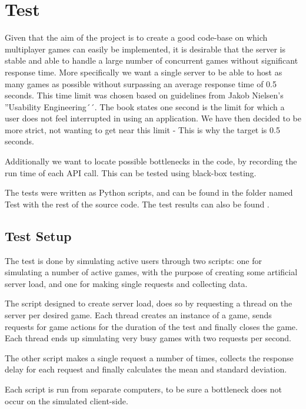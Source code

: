 \section{Test} \label{sec:test}
Given that the aim of the project is to create a good code-base on which multiplayer games can easily be implemented, it is desirable that the server is stable and able to handle a large number of concurrent games without significant response time. More specifically we want a single server to be able to host as many games as possible without surpassing an average response time of 0.5 seconds. This time limit was chosen based on guidelines from Jakob Nielsen's ''Usability Engineering´´.\cite{response-time} The book states one second is the limit for which a user does not feel interrupted in using an application. We have then decided to be more strict, not wanting to get near this limit - This is why the target is 0.5 seconds.

Additionally we want to locate possible bottlenecks in the code, by recording the run time of each API call. This can be tested using black-box testing.

The tests were written as Python scripts, and can be found in the folder named Test with the rest of the source code. The test results can also be found .

\subsection{Test Setup} \label{sec:testSetup}
The test is done by simulating active users through two scripts: one for simulating a number of active games, with the purpose of creating some artificial server load, and one for making single requests and collecting data.

The script designed to create server load, does so by requesting a thread on the server per desired game. Each thread creates an instance of a game, sends requests for game actions for the duration of the test and finally closes the game. Each thread ends up simulating very busy games with two requests per second. 

The other script makes a single request a number of times, collects the response delay for each request and finally calculates the mean and standard deviation.

Each script is run from separate computers, to be sure a bottleneck does not occur on the simulated client-side.

